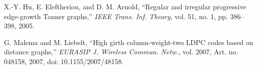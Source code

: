 X.-Y. Hu, E. Eleftheriou, and D. M. Arnold,
``Regular and irregular progressive edge-growth Tanner graphs,''
\emph{IEEE Trans. Inf. Theory}, vol. 51, no. 1, pp. 386--398, 2005.

G. Malema and M. Liebelt,
``High girth column-weight-two LDPC codes based on distance graphs,''
\emph{EURASIP J. Wireless Commun. Netw.}, vol. 2007,
Art. no. 048158, 2007, doi: 10.1155/2007/48158.
